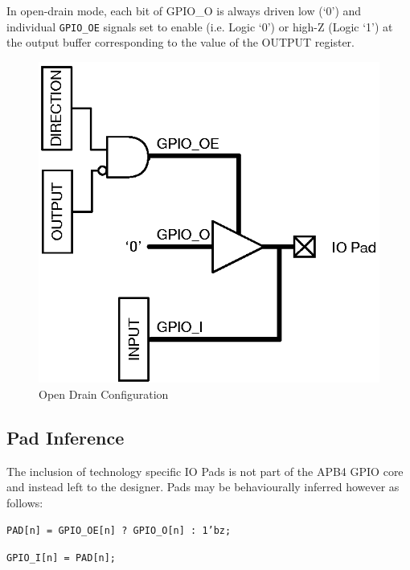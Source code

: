 In open-drain mode, each bit of GPIO\_O is always driven low (`0') and individual
\texttt{GPIO\_OE} signals set to enable (i.e. Logic `0') or high-Z (Logic `1') at
the output buffer corresponding to the value of the OUTPUT register.

\begin{figure}[tbh]
	\centering
	\includegraphics{assets/img/apb4-gpio-od}
	\caption{Open Drain Configuration}
	\label{fig:apb4-gpio-od}
\end{figure}

\subsection{Pad Inference}\label{pad-inference}

The inclusion of technology specific IO Pads is not part of the APB4
GPIO core and instead left to the designer. Pads may be behaviourally
inferred however as follows:

\texttt{PAD[n] = GPIO\_OE[n] ? GPIO\_O[n] : 1'bz;}

\texttt{GPIO\_I[n] = PAD[n];}
